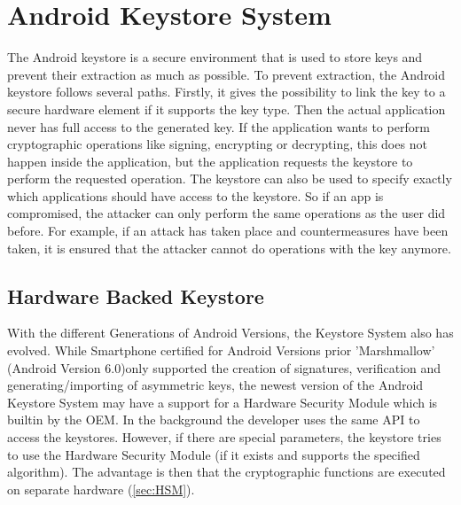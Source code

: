 \documentclass[12pt,oneside,a4paper,parskip]{scrbook}
\begin{document}


\section{Android Keystore System}

The Android keystore is a secure environment that is used to store keys and prevent their extraction as much as possible. To prevent extraction, the Android keystore follows several paths. Firstly, it gives the possibility to link the key to a secure hardware element if it supports the key type. Then the actual application never has full access to the generated key. If the application wants to perform cryptographic operations like signing, encrypting or decrypting, this does not happen inside the application, but the application requests the keystore to perform the requested operation. The keystore can also be used to specify exactly which applications should have access to the keystore. So if an app is compromised, the attacker can only perform the same operations as the user did before. For example, if an attack has taken place and countermeasures have been taken, it is ensured that the attacker cannot do operations with the key anymore. 
\parencite{google_android_2020}

\subsection{Hardware Backed Keystore}

With the different Generations of Android Versions, the Keystore System also has evolved. While Smartphone certified for Android Versions prior 'Marshmallow' (Android Version 6.0)only supported the creation of signatures, verification and generating/importing of asymmetric keys, the newest version of the Android Keystore System may have a support for a Hardware Security Module which is builtin by the OEM. In the background the developer uses the same API to access the keystores. However, if there are special parameters, the keystore tries to use the Hardware Security Module (if it exists and supports the specified algorithm). The advantage is then that the cryptographic functions are executed on separate hardware (\ref{sec:HSM}). \parencite{google_hardware-backed_2020}
\end{document}
